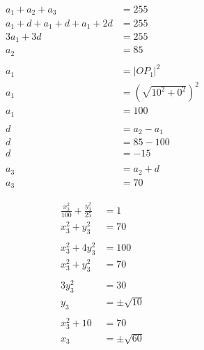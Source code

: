\documentclass{article}
\begin{document}
\centering
\begin{minipage}[t]{0.4\linewidth}
\[\begin{aligned}
	a_1+a_2+a_3&=255 \\
	a_1+d+a_1+d+a_1+2d&=255 \\
	3a_1+3d&=255 \\
	a_2&=85 \\
	\\
	a_1&=\left|OP_1\right|^2 \\
	a_1&=(\sqrt{10^2+0^2})^2 \\
	a_1&=100 \\
	\\
	d&=a_2-a_1 \\
	d&=85-100 \\
	d&=-15 \\
	\\
	a_3&=a_2+d \\
	a_3&=70
\end{aligned}\]
\end{minipage}
\begin{minipage}[t]{0.3\linewidth}
\begin{align*}
	\frac{x_3^2}{100}+\frac{y_3^2}{25}&=1 \\
	x_3^2+y_3^2&=70 \\
	\\
	x_3^2+4y_3^2&=100 \\
	x_3^2+y_3^2&=70 \\
	\\
	3y_3^2&=30 \\
	y_3&=\pm\sqrt{10} \\
	\\
	x_3^2+10&=70 \\
	x_3&=\pm\sqrt{60}
\end{align*}
\setlength{\abovedisplayskip}{0pt}
\qquad{}
\end{minipage}
\flushleft
\end{document}
